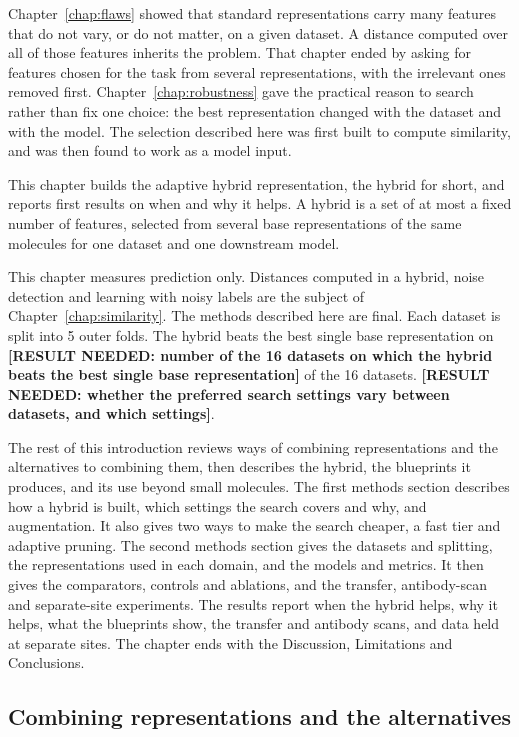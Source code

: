 Chapter~\ref{chap:flaws} showed that standard representations carry many features that do not vary, or do not matter, on a given dataset. A distance computed over all of those features inherits the problem. That chapter ended by asking for features chosen for the task from several representations, with the irrelevant ones removed first. Chapter~\ref{chap:robustness} gave the practical reason to search rather than fix one choice: the best representation changed with the dataset and with the model. The selection described here was first built to compute similarity, and was then found to work as a model input.

This chapter builds the adaptive hybrid representation, the hybrid for short, and reports first results on when and why it helps. A hybrid is a set of at most a fixed number of features, selected from several base representations of the same molecules for one dataset and one downstream model.

This chapter measures prediction only. Distances computed in a hybrid, noise detection and learning with noisy labels are the subject of Chapter~\ref{chap:similarity}. The methods described here are final. Each dataset is split into 5 outer folds. The hybrid beats the best single base representation on \textbf{[RESULT NEEDED: number of the 16 datasets on which the hybrid beats the best single base representation]} of the 16 datasets. \textbf{[RESULT NEEDED: whether the preferred search settings vary between datasets, and which settings]}.

The rest of this introduction reviews ways of combining representations and the alternatives to combining them, then describes the hybrid, the blueprints it produces, and its use beyond small molecules. The first methods section describes how a hybrid is built, which settings the search covers and why, and augmentation. It also gives two ways to make the search cheaper, a fast tier and adaptive pruning. The second methods section gives the datasets and splitting, the representations used in each domain, and the models and metrics. It then gives the comparators, controls and ablations, and the transfer, antibody-scan and separate-site experiments. The results report when the hybrid helps, why it helps, what the blueprints show, the transfer and antibody scans, and data held at separate sites. The chapter ends with the Discussion, Limitations and Conclusions.


\subsection{Combining representations and the alternatives}

